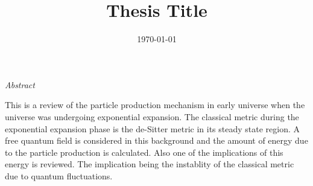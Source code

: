 \documentclass[a4paper, 16pt, oneside]{Thesis}  %
\begin{document}
\frontmatter      %

\title  {Thesis Title}
\addresses  {\groupname\\\deptname\\\univname}  %
\date       {\today}
\subject    {}
\keywords   {}

\maketitle


\fancyhead{}  %
\rhead{\thepage}  %
\lhead{}  %

\pagestyle{fancy}  %

\clearpage  %

\thispagestyle{empty} 

\begin{center}
\huge{\emph{Abstract}}
\end{center}
This is a review of the particle production mechanism in early universe when the universe was undergoing exponential expansion. The classical metric during the exponential expansion phase is the de-Sitter metric in its steady state region. A free quantum field is considered in this background and the amount of energy due to the particle production is calculated. Also one of the implications of this energy is reviewed. The implication being the instablity of the classical metric due to quantum fluctuations.
\end{document}
